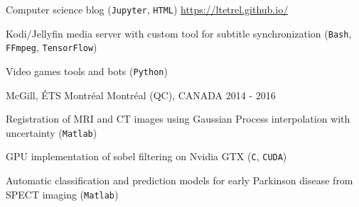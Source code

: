 


\begin{cventries}


\cventry
{} %
{} %
{} %
{} %
{ %
\vspace{-5mm}
\begin{cvitems}
\item {Computer science blog (\texttt{Jupyter}, \texttt{HTML}) \url{https://ltetrel.github.io/}}
\item {Kodi/Jellyfin media server with custom tool for subtitle synchronization (\texttt{Bash}, \texttt{FFmpeg}, \texttt{TensorFlow})}
\item {Video games tools and bots (\texttt{Python})}
\end{cvitems}
}


\cventry
{} %
{McGill, ÉTS Montréal} %
{\hspace{-5mm}Montréal (QC), CANADA} %
{2014 - 2016} %
{ %
\vspace{-5mm}
\begin{cvitems}
\item {Registration of MRI and CT images using Gaussian Process interpolation with uncertainty (\texttt{Matlab})}
\item {GPU implementation of sobel filtering on Nvidia GTX (\texttt{C}, \texttt{CUDA})}
\item {Automatic classification and prediction models for early Parkinson disease from SPECT imaging (\texttt{Matlab})}
\end{cvitems}
}


\end{cventries}
